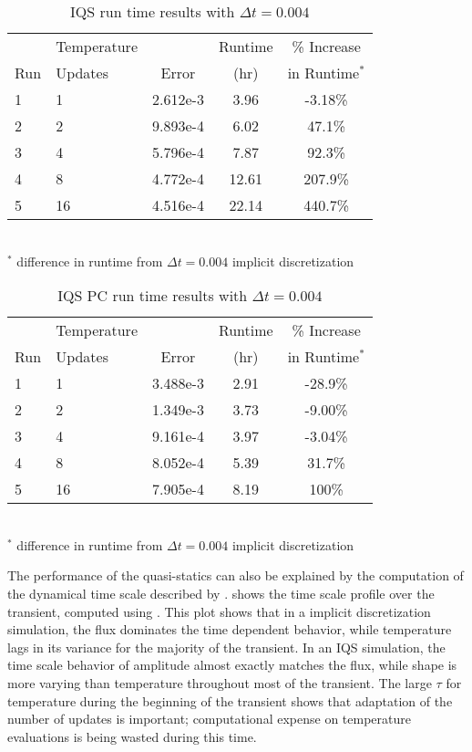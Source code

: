 \begin{table}[!htbp]
\begin{center}
\begin{tabular}{|l|l|ccc|}
\hline
	&  Temperature 	&  		& Runtime 	& \% Increase	\\
Run	&  Updates 	& Error & (hr)		& in Runtime$^*$\\
\hline
1	& 1		& 2.612e-3 	& 3.96 	& -3.18\%	\\
2	& 2		& 9.893e-4 	& 6.02	&  47.1\%	\\
3 	& 4 	& 5.796e-4 	& 7.87	&  92.3\%	\\
4 	& 8 	& 4.772e-4 	& 12.61	& 207.9\% 	\\
5 	& 16	& 4.516e-4 	& 22.14	& 440.7\%	\\
\hline
\end{tabular}
\\
$^*$ difference in runtime from $\Delta t = 0.004$ implicit discretization 
\caption{IQS run time results with $\Delta t = 0.004$}
\label{tab:iqs_lra}
\end{center}
\end{table}

\begin{table}[!htbp]
\begin{center}
\begin{tabular}{|l|l|ccc|}
\hline
	&  Temperature 	&  		& Runtime 	& \% Increase	\\
Run	&  Updates 	& Error & (hr)		& in Runtime$^*$\\
\hline
1	& 1		& 3.488e-3 	& 2.91 	& -28.9\%	\\
2	& 2		& 1.349e-3 	& 3.73	& -9.00\%	\\
3 	& 4 	& 9.161e-4 	& 3.97	& -3.04\%	\\
4 	& 8 	& 8.052e-4 	& 5.39	&  31.7\%	\\
5 	& 16	& 7.905e-4 	& 8.19	&  100\%	\\
\hline
\end{tabular}
\\
$^*$ difference in runtime from $\Delta t = 0.004$ implicit discretization 
\caption{IQS PC run time results with $\Delta t = 0.004$}
\label{tab:iqspc_lra}
\end{center}
\end{table}

The performance of the quasi-statics can also be explained by the computation of the dynamical time scale described by .   shows the time scale profile over the transient, computed using .  This plot shows that in a implicit discretization simulation, the flux dominates the time dependent behavior, while temperature lags in its variance for the majority of the transient.  In an IQS simulation, the time scale behavior of amplitude almost exactly matches the flux, while shape is more varying than temperature throughout most of the transient.  The large $\tau$ for temperature during the beginning of the transient shows that adaptation of the number of updates is important; computational expense on temperature evaluations is being wasted during this time.

